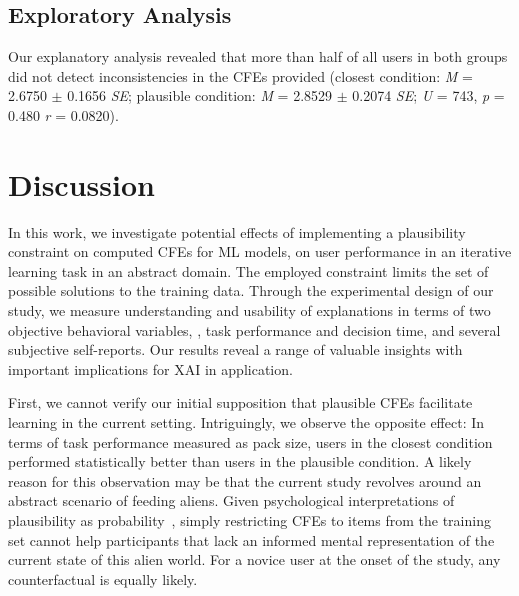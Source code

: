 \subsection{Exploratory Analysis}
Our explanatory analysis revealed that more than half of all users in both groups did not detect inconsistencies in the \glspl{CFE} provided (closest condition: \textit{M} = 2.6750 $\pm$ 0.1656 \textit{SE}; plausible condition: \textit{M} = 2.8529 $\pm$ 0.2074 \textit{SE}; \textit{U} = 743, \textit{p} = 0.480 \textit{r} = 0.0820).

\section{Discussion}\label{sec:discussion}

In this work, we investigate potential effects of implementing a plausibility constraint on computed \glspl{CFE} for \gls{ML} models, on user performance in an iterative learning task in an abstract domain. 
The employed constraint limits the set of possible solutions to the training data.
Through the experimental design of our study, we measure understanding and usability of explanations in terms of two objective behavioral variables, \ie, task performance and decision time, and several subjective self-reports. 
Our results reveal a range of valuable insights with important implications for \gls{XAI} in application.

First, we cannot verify our initial supposition that plausible \glspl{CFE} facilitate learning in the current setting. 
Intriguingly, we observe the opposite effect: In terms of task performance measured as pack size, users in the closest condition performed statistically better than users in the plausible condition.
A likely reason for this observation may be that the current study revolves around an abstract scenario of feeding aliens. 
Given psychological interpretations of plausibility as probability~\citep{pezdek_is_2006, de_brigard_remembering_2013}, simply restricting \glspl{CFE} to items from the training set cannot help participants that lack an informed mental representation of the current state of this alien world. 
For a novice user at the onset of the study, any counterfactual is equally likely.

